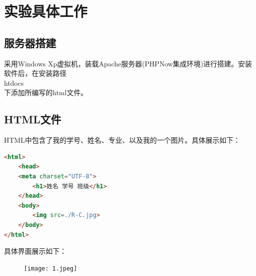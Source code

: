\documentclass[UTF8,a4paper,10pt]{ctexart}
\begin{document}
\section{实验具体工作}
\subsection{服务器搭建}
采用Windows Xp虚拟机，装载Apache服务器(PHPNow集成环境)进行搭建。安装软件后，在安装路径\\htdocs\\下添加所编写的html文件。

\subsection{HTML文件}
HTML中包含了我的学号、姓名、专业、以及我的一个图片。具体展示如下：
\begin{lstlisting}[frame=trbl,language={html}]
<html>
    <head>
	<meta charset="UTF-8">
        <h1>姓名 学号 班级</h1>
    </head>
    <body>
    	<img src=./R-C.jpg>
    </body>
</html>
\end{lstlisting}

具体界面展示如下：
\begin{figure}[H]
    \centering
    \texttt{[image: 1.jpeg]}
    \label{fig:1}
\end{figure}
\end{document}
